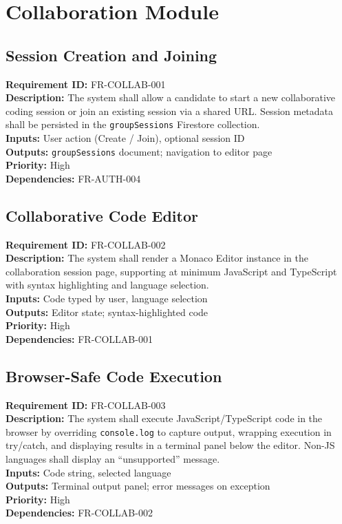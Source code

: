 \documentclass{fisatinternship}
\begin{document}
\vspace{0.4cm}

\section{Collaboration Module}

\subsection{Session Creation and Joining}
\textbf{Requirement ID:} FR-COLLAB-001\\
\textbf{Description:} The system shall allow a candidate to start a new collaborative
coding session or join an existing session via a shared URL. Session metadata shall be
persisted in the \texttt{groupSessions} Firestore collection.\\
\textbf{Inputs:} User action (Create / Join), optional session ID\\
\textbf{Outputs:} \texttt{groupSessions} document; navigation to editor page\\
\textbf{Priority:} High\\
\textbf{Dependencies:} FR-AUTH-004

\vspace{0.4cm}

\subsection{Collaborative Code Editor}
\textbf{Requirement ID:} FR-COLLAB-002\\
\textbf{Description:} The system shall render a Monaco Editor instance in the collaboration
session page, supporting at minimum JavaScript and TypeScript with syntax highlighting and
language selection.\\
\textbf{Inputs:} Code typed by user, language selection\\
\textbf{Outputs:} Editor state; syntax-highlighted code\\
\textbf{Priority:} High\\
\textbf{Dependencies:} FR-COLLAB-001

\vspace{0.4cm}

\subsection{Browser-Safe Code Execution}
\textbf{Requirement ID:} FR-COLLAB-003\\
\textbf{Description:} The system shall execute JavaScript/TypeScript code in the browser
by overriding \texttt{console.log} to capture output, wrapping execution in try/catch,
and displaying results in a terminal panel below the editor. Non-JS languages shall
display an ``unsupported'' message.\\
\textbf{Inputs:} Code string, selected language\\
\textbf{Outputs:} Terminal output panel; error messages on exception\\
\textbf{Priority:} High\\
\textbf{Dependencies:} FR-COLLAB-002
\end{document}
